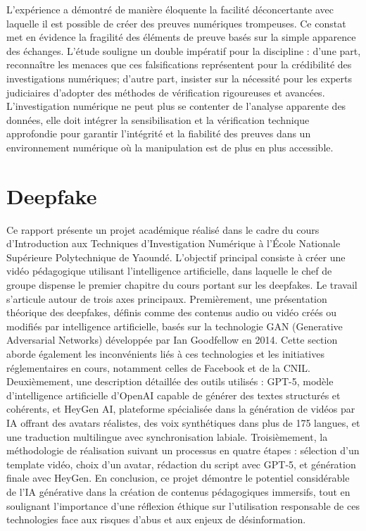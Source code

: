 \documentclass[12pt, openany]{report}
\begin{document}
L'expérience a démontré de manière éloquente la facilité déconcertante avec laquelle il est possible de créer des preuves numériques trompeuses. Ce constat met en évidence la fragilité des éléments de preuve basés sur la simple apparence des échanges. L'étude souligne un double impératif pour la discipline : d'une part, reconnaître les menaces que ces falsifications représentent pour la crédibilité des investigations numériques; d'autre part, insister sur la nécessité pour les experts judiciaires d'adopter des méthodes de vérification rigoureuses et avancées. L'investigation numérique ne peut plus se contenter de l'analyse apparente des données, elle doit intégrer la sensibilisation et la vérification technique approfondie pour garantir l'intégrité et la fiabilité des preuves dans un environnement numérique où la manipulation est de plus en plus accessible.
\newpage
\section{Deepfake}
Ce rapport présente un projet académique réalisé dans le cadre du cours d'Introduction aux Techniques d'Investigation Numérique à l'École Nationale Supérieure Polytechnique de Yaoundé. L'objectif principal consiste à créer une vidéo pédagogique utilisant l'intelligence artificielle, dans laquelle le chef de groupe dispense le premier chapitre du cours portant sur les deepfakes.
Le travail s'articule autour de trois axes principaux. Premièrement, une présentation théorique des deepfakes, définis comme des contenus audio ou vidéo créés ou modifiés par intelligence artificielle, basés sur la technologie GAN (Generative Adversarial Networks) développée par Ian Goodfellow en 2014. Cette section aborde également les inconvénients liés à ces technologies et les initiatives réglementaires en cours, notamment celles de Facebook et de la CNIL.
Deuxièmement, une description détaillée des outils utilisés : GPT-5, modèle d'intelligence artificielle d'OpenAI capable de générer des textes structurés et cohérents, et HeyGen AI, plateforme spécialisée dans la génération de vidéos par IA offrant des avatars réalistes, des voix synthétiques dans plus de 175 langues, et une traduction multilingue avec synchronisation labiale.
Troisièmement, la méthodologie de réalisation suivant un processus en quatre étapes : sélection d'un template vidéo, choix d'un avatar, rédaction du script avec GPT-5, et génération finale avec HeyGen.
En conclusion, ce projet démontre le potentiel considérable de l'IA générative dans la création de contenus pédagogiques immersifs, tout en soulignant l'importance d'une réflexion éthique sur l'utilisation responsable de ces technologies face aux risques d'abus et aux enjeux de désinformation.
\end{document}
